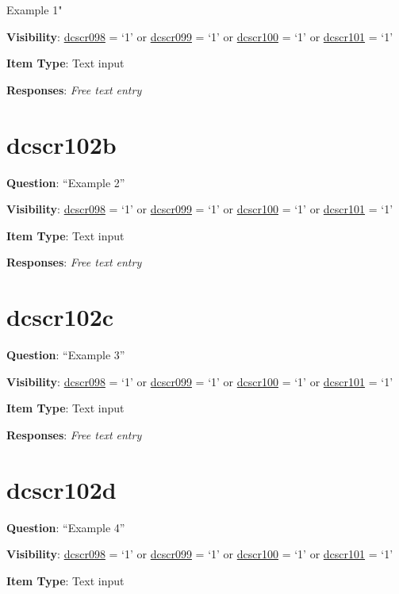\documentclass[]{book}
\begin{document}
Example 1"

\textbf{Visibility}: \protect\hyperlink{dcscr098}{dcscr098} = `1' or \protect\hyperlink{dcscr099}{dcscr099} = `1' or \protect\hyperlink{dcscr100}{dcscr100} = `1' or \protect\hyperlink{dcscr101}{dcscr101} = `1'

\textbf{Item Type}: Text input

\textbf{Responses}: \emph{Free text entry}

\hypertarget{dcscr102b}{%
\section{dcscr102b}\label{dcscr102b}}

\textbf{Question}: ``Example 2''

\textbf{Visibility}: \protect\hyperlink{dcscr098}{dcscr098} = `1' or \protect\hyperlink{dcscr099}{dcscr099} = `1' or \protect\hyperlink{dcscr100}{dcscr100} = `1' or \protect\hyperlink{dcscr101}{dcscr101} = `1'

\textbf{Item Type}: Text input

\textbf{Responses}: \emph{Free text entry}

\hypertarget{dcscr102c}{%
\section{dcscr102c}\label{dcscr102c}}

\textbf{Question}: ``Example 3''

\textbf{Visibility}: \protect\hyperlink{dcscr098}{dcscr098} = `1' or \protect\hyperlink{dcscr099}{dcscr099} = `1' or \protect\hyperlink{dcscr100}{dcscr100} = `1' or \protect\hyperlink{dcscr101}{dcscr101} = `1'

\textbf{Item Type}: Text input

\textbf{Responses}: \emph{Free text entry}

\hypertarget{dcscr102d}{%
\section{dcscr102d}\label{dcscr102d}}

\textbf{Question}: ``Example 4''

\textbf{Visibility}: \protect\hyperlink{dcscr098}{dcscr098} = `1' or \protect\hyperlink{dcscr099}{dcscr099} = `1' or \protect\hyperlink{dcscr100}{dcscr100} = `1' or \protect\hyperlink{dcscr101}{dcscr101} = `1'

\textbf{Item Type}: Text input
\end{document}
